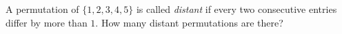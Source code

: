 A permutation of $\{1,2,3,4,5\}$ is called \emph{distant} if every two consecutive entries differ by more than $1$. How many distant permutations are there?
